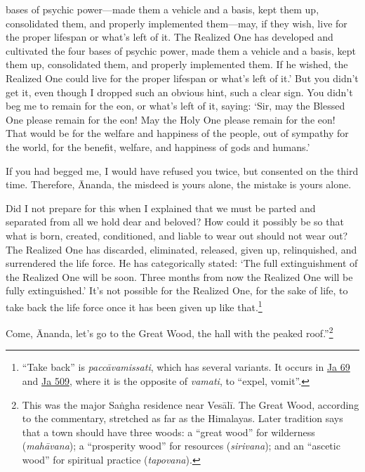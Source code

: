 \documentclass[12pt,openany]{book}%
\begin{document}
bases of psychic power—made them a vehicle and a basis, kept them up, consolidated them, and properly implemented them—may, if they wish, live for the proper lifespan or what’s left of it. The Realized One has developed and cultivated the four bases of psychic power, made them a vehicle and a basis, kept them up, consolidated them, and properly implemented them. If he wished, the Realized One could live for the proper lifespan or what’s left of it.’ But you didn’t get it, even though I dropped such an obvious hint, such a clear sign. You didn’t beg me to remain for the eon, or what’s left of it, saying: ‘Sir, may the Blessed One please remain for the eon! May the Holy One please remain for the eon! That would be for the welfare and happiness of the people, out of sympathy for the world, for the benefit, welfare, and happiness of gods and humans.’ 

If you had begged me, I would have refused you twice, but consented on the third time. Therefore, Ānanda, the misdeed is yours alone, the mistake is yours alone. 

Did I not prepare for this when I explained that we must be parted and separated from all we hold dear and beloved? How could it possibly be so that what is born, created, conditioned, and liable to wear out should not wear out? The Realized One has discarded, eliminated, released, given up, relinquished, and surrendered the life force. He has categorically stated: ‘The full extinguishment of the Realized One will be soon. Three months from now the Realized One will be fully extinguished.’ It’s not possible for the Realized One, for the sake of life, to take back the life force once it has been given up like that.\footnote{“Take back” is \textit{\textsanskrit{paccāvamissati}}, which has several variants. It occurs in \href{https://suttacentral.net/ja69/en/sujato}{Ja 69} and \href{https://suttacentral.net/ja509/en/sujato}{Ja 509}, where it is the opposite of \textit{vamati}, to “expel, vomit”. } 

Come, Ānanda, let’s go to the Great Wood, the hall with the peaked roof.”\footnote{This was the major \textsanskrit{Saṅgha} residence near \textsanskrit{Vesālī}. The Great Wood, according to the commentary, stretched as far as the Himalayas. Later tradition says that a town should have three woods: a “great wood” for wilderness (\textit{\textsanskrit{mahāvana}}); a “prosperity wood” for resources (\textit{sirivana}); and an “ascetic wood” for spiritual practice (\textit{tapovana}). } 
\end{document}
